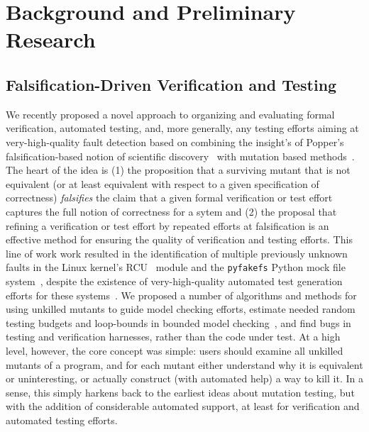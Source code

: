 \section{Background and Preliminary Research}

\subsection{Falsification-Driven Verification and Testing}

We recently proposed a novel approach to organizing and evaluating
formal verification, automated testing, and, more generally, any
testing efforts aiming at very-high-quality fault detection based on
combining the insight's of Popper's falsification-based notion of
scientific discovery~\cite{Popper,popperconjectures} with mutation
based methods~\cite{groce2015verified,groce2018verified,mutKernel}.
The heart of the idea is (1) the proposition that a surviving mutant that is not
equivalent (or at least equivalent with respect to a given
specification of correctness) \emph{falsifies} the claim that a given
formal verification or test effort captures the full notion of
correctness for a sytem and (2) the proposal that refining a
verification or test effort by repeated efforts at falsification is an
effective method for ensuring the quality of verification and testing
efforts.  This line of work
work resulted in the identification of multiple previously unknown faults in
the Linux kernel's
RCU~\cite{MathieuDesnoyers2012URCU,DinakarGuniguntala2008IBMSysJ,McKenney:2013:SDS:2483852.2483867}
module and the {\tt pyfakefs} Python mock file
system~\cite{pyfakefs}, despite the existence of very-high-quality
automated test generation efforts for these systems~\cite{rcutorture,TSTL}.  We proposed a number of algorithms and
methods for using unkilled mutants to guide model checking efforts,
estimate needed random testing budgets and loop-bounds in bounded model
checking~\cite{CBMCp,BMC}, and find bugs in testing and verification
harnesses, rather than the code under test.  At a high level, however,
the core concept was simple:  users should examine all unkilled
mutants of a program, and for each mutant either understand why it is
equivalent or uninteresting, or actually construct (with automated
help) a way to kill it.  In a sense, this simply harkens back to the
earliest ideas about mutation testing, but with the addition of
considerable automated support, at least for verification and
automated testing efforts.

